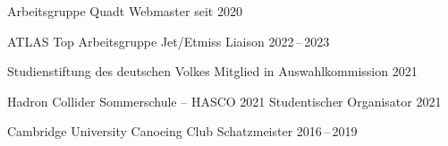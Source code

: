 \begin{cvhonors}

  \cvhonor
    {Arbeitsgruppe Quadt} %
    {Webmaster} %
    {} %
    {seit 2020} %

  \cvhonor
    {ATLAS Top Arbeitsgruppe} %
    {Jet/Etmiss Liaison} %
    {} %
    {2022\,--\,2023} %


  \cvhonor
    {Studienstiftung des deutschen Volkes} %
    {Mitglied in Auswahlkommission} %
    {} %
    {2021} %

  \cvhonor
    {Hadron Collider Sommerschule -- HASCO 2021} %
    {Studentischer Organisator} %
    {} %
    {2021} %

   \cvhonor
     {Cambridge University Canoeing Club} %
     {Schatzmeister} %
     {} %
     {2016\,--\,2019} %

\end{cvhonors}



\begin{cvpubs}



\end{cvpubs}


%

% 
